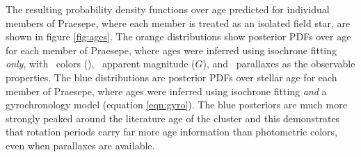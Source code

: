 The resulting probability density functions over age predicted for individual
members of Praesepe, where each member is treated as an isolated field star,
are shown in figure \ref{fig:ages}.
The orange distributions show posterior PDFs over age for each member of
Praesepe, where ages were inferred using isochrone fitting {\it only},
with \gaia\ colors (\gcolor), \gaia\ apparent magnitude ($G$), and \gaia\
parallaxes as the observable properties.
The blue distributions are posterior PDFs over stellar age for each member of
Praesepe, where ages were inferred using isochrone fitting {\it and}
a gyrochronology model (equation \ref{eqn:gyro}).
The blue posteriors are much more strongly peaked around the literature age of
the cluster and this demonstrates that rotation periods carry far more age
information than photometric colors, even when parallaxes are available.


